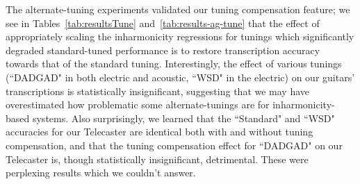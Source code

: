 \documentclass[12pt]{cmuthesis}
\begin{document}
The alternate-tuning experiments validated our tuning compensation feature; we see in Tables~\ref{tab:resultsTune} and~\ref{tab:results-ag-tune} that the effect of appropriately scaling the inharmonicity regressions for tunings which significantly degraded standard-tuned performance is to restore transcription accuracy towards that of the standard tuning. Interestingly, the effect of various tunings (``DADGAD" in both electric and acoustic, ``WSD" in the electric) on our guitars' transcriptions is statistically insignificant, suggesting that we may have overestimated how problematic some alternate-tunings are for inharmonicity-based systems. Also surprisingly, we learned that the ``Standard" and ``WSD" accuracies for our Telecaster are identical both with and without tuning compensation, and that the tuning compensation effect for ``DADGAD" on our Telecaster is, though statistically insignificant, detrimental. These were perplexing results which we couldn't answer.

\end{document}
